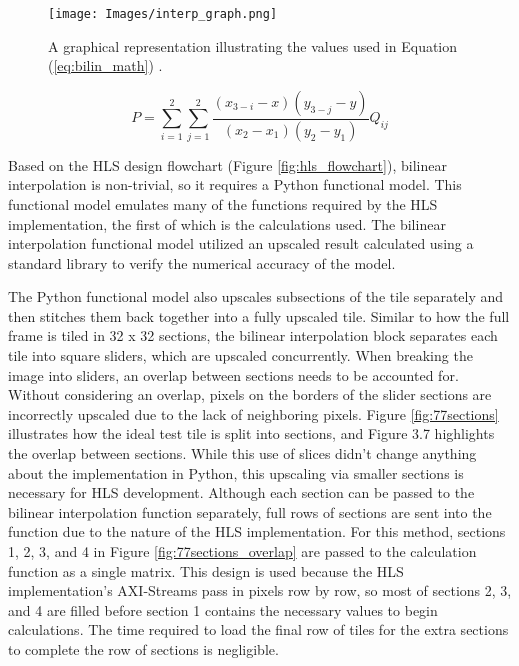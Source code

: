 \documentclass{article}
\newcounter{subsubsubsection}[subsubsection]
\begin{document}
                \begin{figure}[!htb] 
                    \centering
                    \texttt{[image: Images/interp\_graph.png]} 
                    \caption{A graphical representation illustrating the values used in Equation (\ref{eq:bilin_math}) \cite{szcezepanek_bilinear_2024}.}
                    \label{fig:interp_graph} 
                \end{figure}
                \begin{equation}
                    \label{eq:bilin_math}
                    P = \sum_{i=1}^{2} \sum_{j=1}^{2} 
                    \frac{(x_{3-i} - x)(y_{3-j} - y)}{(x_2 - x_1)(y_2 - y_1)} Q_{ij}
                \end{equation}
            
                \noindent Based on the HLS design flowchart (Figure \ref{fig:hls_flowchart}), bilinear interpolation is non-trivial, so it requires a Python functional model. This functional model emulates many of the functions required by the HLS implementation, the first of which is the calculations used. The bilinear interpolation functional model utilized an upscaled result calculated using a standard library to verify the numerical accuracy of the model. 
                \par The Python functional model also upscales subsections of the tile separately and then stitches them back together into a fully upscaled tile. Similar to how the full frame is tiled in 32 x 32 sections, the bilinear interpolation block separates each tile into square sliders, which are upscaled concurrently. When breaking the image into sliders, an overlap between sections needs to be accounted for. Without considering an overlap, pixels on the borders of the slider sections are incorrectly upscaled due to the lack of neighboring pixels. Figure \ref{fig:77sections} illustrates how the ideal test tile is split into sections, and Figure 3.7 highlights the overlap between sections. While this use of slices didn’t change anything about the implementation in Python, this upscaling via smaller sections is necessary for HLS development. Although each section can be passed to the bilinear interpolation function separately, full rows of sections are sent into the function due to the nature of the HLS implementation. For this method, sections 1, 2, 3, and 4 in Figure \ref{fig:77sections_overlap} are passed to the calculation function as a single matrix. This design is used because the HLS implementation’s AXI-Streams pass in pixels row by row, so most of sections 2, 3, and 4 are filled before section 1 contains the necessary values to begin calculations. The time required to load the final row of tiles for the extra sections to complete the row of sections is negligible.
\end{document}
